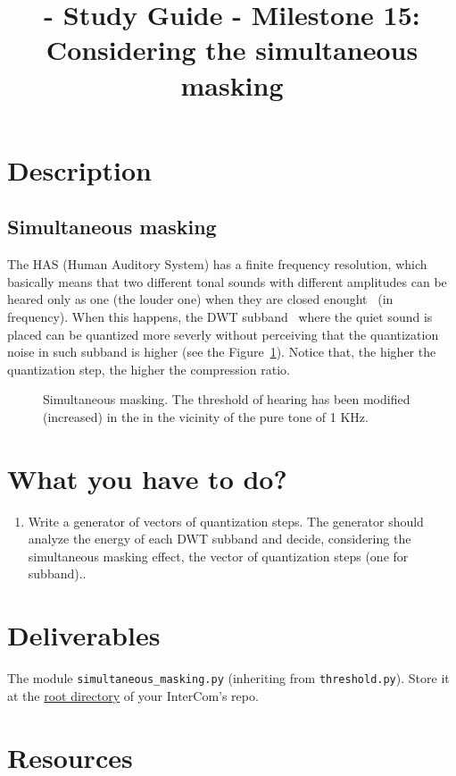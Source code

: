 

\title{\TM{} - Study Guide - Milestone 15: Considering the simultaneous masking}

\maketitle

\section{Description}

\subsection{Simultaneous masking}
The HAS (Human Auditory System) has a finite frequency resolution,
which basically means that two different tonal sounds with different
amplitudes can be heared only as one (the louder one) when they are
closed enought~\cite{bosi2003intro} (in frequency). When this happens, the DWT
subband~\cite{vetterli1995wavelets} where the quiet sound is placed
can be quantized more severly without perceiving that the quantization
noise in such subband is higher (see the Figure~\ref{fig:SM}). Notice
that, the higher the quantization step, the higher the compression
ratio.

\begin{figure}
  \centering
  \caption{Simultaneous masking. The threshold of hearing has been modified (increased) in the in the vicinity of the pure tone of 1 KHz.}
  \label{fig:SM}
\end{figure}

\section{What you have to do?}

\begin{enumerate}
\item Write a generator of vectors of quantization steps. The
  generator should analyze the energy of each DWT subband and decide,
  considering the simultaneous masking effect, the vector of
  quantization steps (one for subband)..
\end{enumerate}

\section{Deliverables}

The module \verb|simultaneous_masking.py| (inheriting from
\verb|threshold.py|). Store it at the
\href{https://github.com/Tecnologias-multimedia/intercom}{root
  directory} of your InterCom's repo.

\section{Resources}



